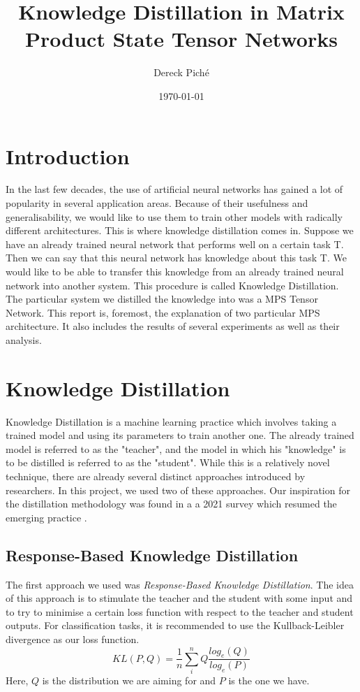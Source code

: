 \documentclass{article}
\title{Knowledge Distillation in Matrix Product State Tensor Networks}
\author{Dereck Piché}
\date{\today}
\theoremstyle{definition}
\theoremstyle{definition}
\begin{document}
\maketitle

\section{Introduction}
In the last few decades, the use of artificial neural networks has gained a lot of popularity in several application areas. Because of their usefulness and generalisability, we would like to use them to train other models with radically different architectures. This is where knowledge distillation comes in. Suppose we have an already trained neural network that performs well on a certain task T. Then we can say that this neural network has knowledge about this task T. We would like to be able to transfer this knowledge from an already trained neural network into another system. This procedure is called Knowledge Distillation. The particular system we distilled the knowledge into was a MPS Tensor Network. This report is, foremost, the explanation of two particular MPS architecture. It also includes the results of several experiments as well as their analysis.


\section{Knowledge Distillation}
Knowledge Distillation is a machine learning practice which involves
taking a trained model and using its parameters to train another one.
The already trained model is referred to as the "teacher", and 
the model in which his "knowledge" is to be distilled is referred to as
the "student". While this is a relatively novel technique, there are 
already several distinct approaches introduced by researchers.
In this project, we used two of these approaches. Our inspiration for the distillation 
methodology was found in a a 2021 survey which resumed the emerging 
practice \cite{Gou_2021}.

\subsection{Response-Based Knowledge Distillation}
The first approach we used was \emph{Response-Based Knowledge Distillation}. The idea of this approach is to stimulate the teacher and the student with some input and to try to minimise a certain loss function with respect to the teacher and student outputs. For classification tasks, it is recommended to use the Kullback-Leibler divergence as our loss function. 
\begin{equation}
    KL(P, Q) = \frac{1}{n} \sum_i^n Q \frac{log_e(Q)}{log_e(P)}
\end{equation}
Here, $Q$ is the distribution we are aiming for and $P$ is the one we have.
\end{document}
